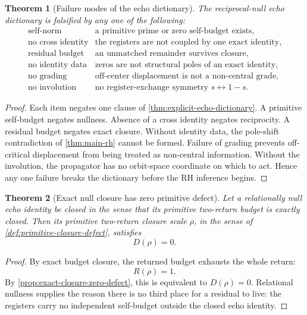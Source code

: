 \documentclass[11pt,a4paper]{article}
\theoremstyle{plain}
\newtheorem{theorem}{Theorem}[section]
\theoremstyle{definition}
\theoremstyle{remark}
\numberwithin{equation}{section}
\begin{document}
\begin{theorem}[Failure modes of the echo dictionary]
\label{thm:echo-dictionary-failure-modes}
The reciprocal-null echo dictionary is falsified by any one of the
following:
\[
\begin{array}{ll}
\text{self-norm} & \text{a primitive prime or zero self-budget exists},\\
\text{no cross identity} & \text{the registers are not coupled by one exact identity},\\
\text{residual budget} & \text{an unmatched remainder survives closure},\\
\text{no identity data} & \text{zeros are not structural poles of an exact identity},\\
\text{no grading} & \text{off-center displacement is not a non-central grade},\\
\text{no involution} & \text{no register-exchange symmetry }s\leftrightarrow1{-}s.
\end{array}
\]
\end{theorem}

\begin{proof}
Each item negates one clause of \cref{thm:explicit-echo-dictionary}.
A primitive self-budget negates nullness.  Absence of a cross identity
negates reciprocity.  A residual budget negates exact closure.  Without
identity data, the pole-shift contradiction of \cref{thm:main-rh}
cannot be formed.  Failure of grading prevents off-critical displacement
from being treated as non-central information.  Without the involution,
the propagator has no orbit-space coordinate on which to act.  Hence
any one failure breaks the dictionary before the RH inference begins.
\end{proof}

\begin{theorem}[Exact null closure has zero primitive defect]
\label{thm:exact-null-zero-defect}
Let a relationally null echo identity be closed in the sense that its
primitive two-return budget is exactly closed.  Then its primitive
two-return closure scale \(\rho\), in the sense of
\cref{def:primitive-closure-defect}, satisfies
\[
  D(\rho)=0.
\]
\end{theorem}

\begin{proof}
By exact budget closure, the returned budget exhausts the whole return:
\[
  R(\rho)=1.
\]
By \cref{prop:exact-closure-zero-defect}, this is equivalent to
\(D(\rho)=0\).  Relational nullness supplies the reason there is no
third place for a residual to live: the registers carry no independent
self-budget outside the closed echo identity.
\end{proof}
\end{document}
